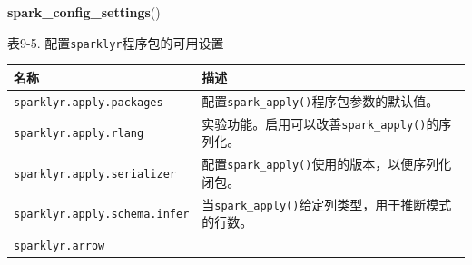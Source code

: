 \documentclass[
]{article}
\newenvironment{Shaded}{\begin{snugshade}}{\end{snugshade}}
\newcommand{\KeywordTok}[1]{\textcolor[rgb]{0.13,0.29,0.53}{\textbf{#1}}}
\newcommand{\NormalTok}[1]{#1}
\begin{document}
\begin{Shaded}
\begin{Highlighting}[]
\KeywordTok{spark_config_settings}\NormalTok{()}
\end{Highlighting}
\end{Shaded}

表9-5. 配置\texttt{sparklyr}程序包的可用设置

\begin{longtable}[]{@{}ll@{}}
\toprule
\begin{minipage}[b]{0.47\columnwidth}\raggedright
名称\strut
\end{minipage} & \begin{minipage}[b]{0.47\columnwidth}\raggedright
描述\strut
\end{minipage}\tabularnewline
\midrule
\endhead
\begin{minipage}[t]{0.47\columnwidth}\raggedright
\texttt{sparklyr.apply.packages}\strut
\end{minipage} & \begin{minipage}[t]{0.47\columnwidth}\raggedright
配置\texttt{spark\_apply()}程序包参数的默认值。\strut
\end{minipage}\tabularnewline
\begin{minipage}[t]{0.47\columnwidth}\raggedright
\texttt{sparklyr.apply.rlang}\strut
\end{minipage} & \begin{minipage}[t]{0.47\columnwidth}\raggedright
实验功能。启用可以改善\texttt{spark\_apply()}的序列化。\strut
\end{minipage}\tabularnewline
\begin{minipage}[t]{0.47\columnwidth}\raggedright
\texttt{sparklyr.apply.serializer}\strut
\end{minipage} & \begin{minipage}[t]{0.47\columnwidth}\raggedright
配置\texttt{spark\_apply()}使用的版本，以便序列化闭包。\strut
\end{minipage}\tabularnewline
\begin{minipage}[t]{0.47\columnwidth}\raggedright
\texttt{sparklyr.apply.schema.infer}\strut
\end{minipage} & \begin{minipage}[t]{0.47\columnwidth}\raggedright
当\texttt{spark\_apply()}给定列类型，用于推断模式的行数。\strut
\end{minipage}\tabularnewline
\begin{minipage}[t]{0.47\columnwidth}\raggedright
\texttt{sparklyr.arrow}\strut
\end{minipage} & \begin{minipage}[t]{0.47\columnwidth}\raggedright

\end{minipage}
\end{longtable}
\end{document}
